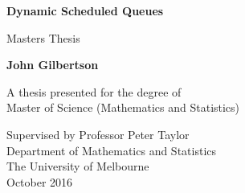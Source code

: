 \begin{titlepage}
    \begin{center}
        \vspace*{1cm}
        
        \Huge
        \textbf{Dynamic Scheduled Queues}
        
        \vspace{0.5cm}
        
        \LARGE
        Masters Thesis
        
        \vspace{1.5cm}
        
        \textbf{John Gilbertson}
        
        \vfill
        
        A thesis presented for the degree of\\
        Master of Science (Mathematics and Statistics)
        
        \vspace{0.8cm}
        
        \Large
        Supervised by Professor Peter Taylor\\
        Department of Mathematics and Statistics\\
        The University of Melbourne\\
        October 2016
        
    \end{center}
\end{titlepage}















































